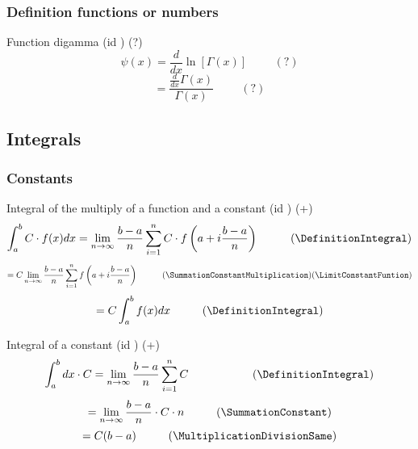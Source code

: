 \documentclass{book}
\begin{document}
                \subsubsection{Definition functions or numbers}
                    Function digamma (id \DerivativeFunctionDigamma) (?)
                    \[\psi(x) = \frac{d}{dx} \ln[\Gamma(x)] \hspace{1cm} (?)\]
                    \[= \frac{\frac{d}{dx} \Gamma(x)}{\Gamma(x)} \hspace{1cm} (?)\]

            \subsection{Integrals}
                \subsubsection{Constants}
                    Integral of the multiply of a function and a constant (id \IntegralMultiplyFunctionConstant) (+)
                    \[\int^b_a C \cdot f(x) dx = \lim_{n \rightarrow \infty} \frac{b - a}{n} \sum^n_{i=1} C \cdot f\left(a + i \frac{b - a}{n}\right) \hspace{1cm} (\DefinitionIntegral)\]
                    \[= C \lim_{n \rightarrow \infty} \frac{b - a}{n} \sum^n_{i=1} f \left(a + i\frac{b - a}{n}\right) \hspace{1cm} (\SummationConstantMultiplication)(\LimitConstantFuntion)\]
                    \[= C \int^b_a f(x) dx \hspace{1cm} (\DefinitionIntegral)\]

                    Integral of a constant (id \IntegralConstant) (+)
                    \[\int^b_a dx \cdot C = \lim_{n \rightarrow \infty} \frac{b - a}{n} \sum^n_{i=1} C \hspace{1cm} \hspace{1cm} (\DefinitionIntegral)\]
                    \[= \lim_{n \rightarrow \infty} \frac{b - a}{n} \cdot C \cdot n \hspace{1cm} (\SummationConstant)\]
                    \[= C(b - a) \hspace{1cm} (\MultiplicationDivisionSame)\]
\end{document}
